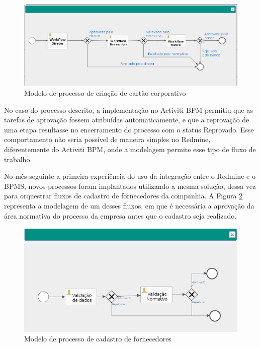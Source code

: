 \begin{figure}[H]
\centering
\includegraphics[width=1\textwidth]{imagens/process_criacao_cartao_corporativo.png}
\caption{Modelo de processo de criação de cartão corporativo}
\label{fig:process_cartao_compras}
\end{figure}

No caso do processo descrito, a implementação no Activiti BPM permitiu que as tarefas de aprovação fossem atribuídas automaticamente, e que a reprovação de uma etapa resultasse no encerramento do processo com o status Reprovado. Esse comportamento não seria possível de maneira simples no Redmine, diferentemente do Activiti BPM, onde a modelagem permite esse tipo de fluxo de trabalho.

No mês seguinte a primeira experiência do uso da integração entre o Redmine e o BPMS, novos processos foram implantados utilizando a mesma solução, dessa vez para orquestrar fluxos de cadastro de fornecedores da companhia. A Figura \ref{fig:processo_cadastro_fornecedores} representa a modelagem de um desses fluxos, em que é necessária a aprovação da área normativa do processo da empresa antes que o cadastro seja realizado.

\begin{figure}[H]
\centering
\includegraphics[width=1\textwidth]{imagens/processo_cadastro_fornecedores.png}
\caption{Modelo de processo de cadastro de fornecedores}
\label{fig:processo_cadastro_fornecedores}
\end{figure}

